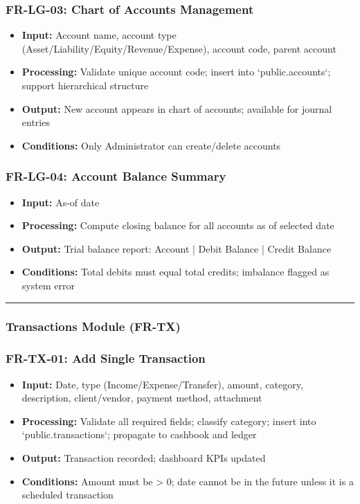 \documentclass[journal, a4paper, onecolumn, 12pt]{IEEEtran}
\begin{document}
\subsubsection{FR-LG-03: Chart of Accounts Management}
\begin{itemize}[leftmargin=*]
\item \textbf{Input:} Account name, account type (Asset/Liability/Equity/Revenue/Expense), account code, parent account
\item \textbf{Processing:} Validate unique account code; insert into `public.accounts`; support hierarchical structure
\item \textbf{Output:} New account appears in chart of accounts; available for journal entries
\item \textbf{Conditions:} Only Administrator can create/delete accounts
\end{itemize}

\subsubsection{FR-LG-04: Account Balance Summary}
\begin{itemize}[leftmargin=*]
\item \textbf{Input:} As-of date
\item \textbf{Processing:} Compute closing balance for all accounts as of selected date
\item \textbf{Output:} Trial balance report: Account | Debit Balance | Credit Balance
\item \textbf{Conditions:} Total debits must equal total credits; imbalance flagged as system error
\end{itemize}

\vspace{1em}\hrule\vspace{1em}

\subsubsection{Transactions Module (FR-TX)}

\subsubsection{FR-TX-01: Add Single Transaction}
\begin{itemize}[leftmargin=*]
\item \textbf{Input:} Date, type (Income/Expense/Transfer), amount, category, description, client/vendor, payment method, attachment
\item \textbf{Processing:} Validate all required fields; classify category; insert into `public.transactions`; propagate to cashbook and ledger
\item \textbf{Output:} Transaction recorded; dashboard KPIs updated
\item \textbf{Conditions:} Amount must be > 0; date cannot be in the future unless it is a scheduled transaction
\end{itemize}
\end{document}
